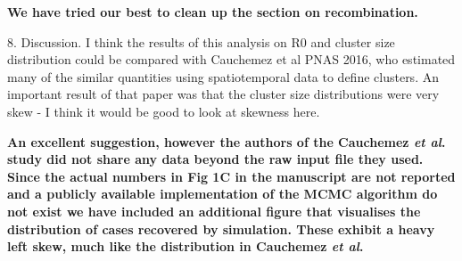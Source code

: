 \documentclass[11pt,oneside,letterpaper]{article}
\begin{document}
\textbf{We have tried our best to clean up the section on recombination.}

8. Discussion. I think the results of this analysis on R0 and cluster size distribution could be compared with Cauchemez et al PNAS 2016, who estimated many of the similar quantities using spatiotemporal data to define clusters. An important result of that paper was that the cluster size distributions were very skew - I think it would be good to look at skewness here.

\textbf{An excellent suggestion, however the authors of the Cauchemez \textit{et al}. study did not share any data beyond the raw input file they used. Since the actual numbers in Fig 1C in the manuscript are not reported and a publicly available implementation of the MCMC algorithm do not exist we have included an additional figure that visualises the distribution of cases recovered by simulation. These exhibit a heavy left skew, much like the distribution in Cauchemez \textit{et al}.}

% 
\end{document}
